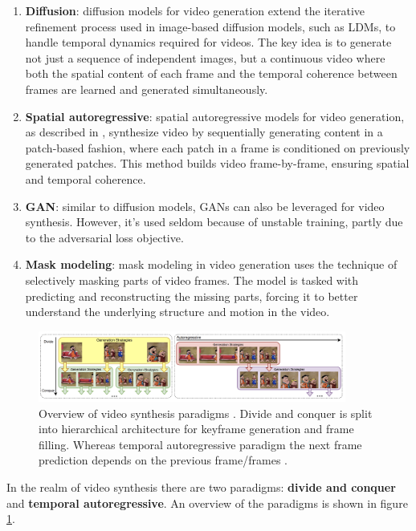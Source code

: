 \begin{enumerate}
    \item \textbf{Diffusion}: diffusion models for video generation extend the iterative refinement process used in image-based diffusion models, such as LDMs, to handle temporal dynamics required for videos. The key idea is to generate not just a sequence of independent images, but a continuous video where both the spatial content of each frame and the temporal coherence between frames are learned and generated simultaneously.
    \item \textbf{Spatial autoregressive}: spatial autoregressive models for video generation, as described in \cite{graves2013generating}, synthesize video by sequentially generating content in a patch-based fashion, where each patch in a frame is conditioned on previously generated patches. This method builds video frame-by-frame, ensuring spatial and temporal coherence.
    \item \textbf{GAN}: similar to diffusion models, GANs can also be leveraged for video synthesis. However, it's used seldom because of unstable training, partly due to the adversarial loss objective.
    \item \textbf{Mask modeling}: mask modeling in video generation uses the technique of selectively masking parts of video frames. The model is tasked with predicting and reconstructing the missing parts, forcing it to better understand the underlying structure and motion in the video.
\end{enumerate}

\begin{figure}
    \centering
    \includegraphics[width=0.9\textwidth]{images/video_synthesis/paradigms.png}
    \caption{Overview of video synthesis paradigms \cite{long_video_survey}. Divide and conquer is split into hierarchical architecture for keyframe generation and frame filling. Whereas temporal autoregressive paradigm the next frame prediction depends on the previous frame/frames \cite{long_video_survey}.}
    \label{fig:video_synthesis_paradigms}
\end{figure}

In the realm of video synthesis there are two paradigms: \textbf{divide and conquer} and \textbf{temporal autoregressive}. An overview of the paradigms is shown in figure \ref{fig:video_synthesis_paradigms}.


